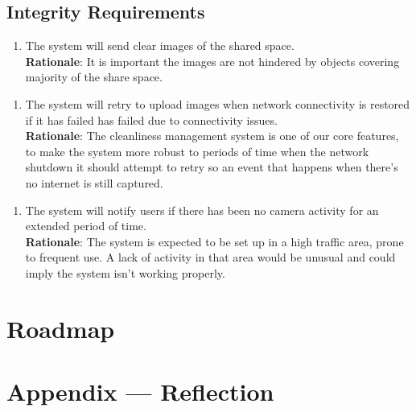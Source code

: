 \documentclass{article}
\begin{document}
\subsection{Integrity Requirements}
\begin{enumerate}[{IR}1. ]
    \item The system will send clear images of the shared space.\\
    \textbf{Rationale}: It is important the images are not hindered by objects covering majority of the share space. 
\end{enumerate} 
\begin{enumerate}[{IR}Mag2. ]
    \item The system will retry to upload images when network connectivity is restored if it has failed has failed due to connectivity issues.\\
    \textbf{Rationale}: The cleanliness management system is one of our core features, to make the system more robust to periods of time when the network shutdown it should attempt to retry so an event that happens when there's no internet is still captured. 
\end{enumerate} 
\begin{enumerate}[{IR}Mag3. ]
    \item The system will notify users if there has been no camera activity for an extended period of time.\\
    \textbf{Rationale}: The system is expected to be set up in a high traffic area, prone to frequent use. A lack of activity in that area would be unusual and could imply the system isn't working properly.
\end{enumerate} 

\section{Roadmap}


\newpage{}

\section*{Appendix --- Reflection}
\end{document}
